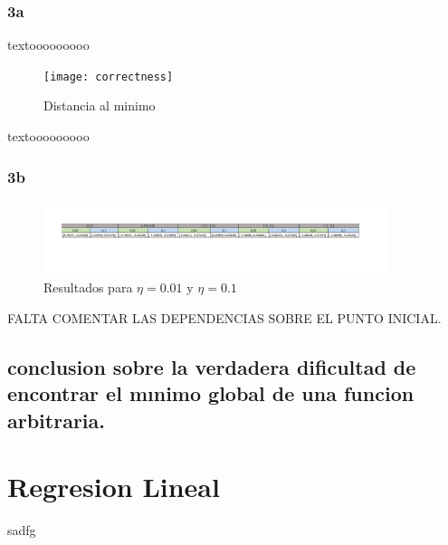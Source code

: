 \subsubsection{3a}
textooooooooo
 \begin{figure}[h]
  \centering
  \texttt{[image: correctness]}
  \caption{Distancia al minimo}
  \label{fig:eta1}
\end{figure}
textooooooooo


\subsubsection{3b}
\begin{figure}[h]
  \centering
  \includegraphics[width=0.90\textwidth]{Exvelpng}
  \caption{Resultados para $\eta = 0.01 $ y $ \eta = 0.1$}
  \label{fig:eta1}
\end{figure}
  
FALTA COMENTAR LAS DEPENDENCIAS SOBRE EL PUNTO INICIAL.

\subsection{ conclusion sobre la verdadera dificultad de encontrar el mınimo
global de una funcion arbitraria.}

\section{Regresion Lineal}

sadfg





